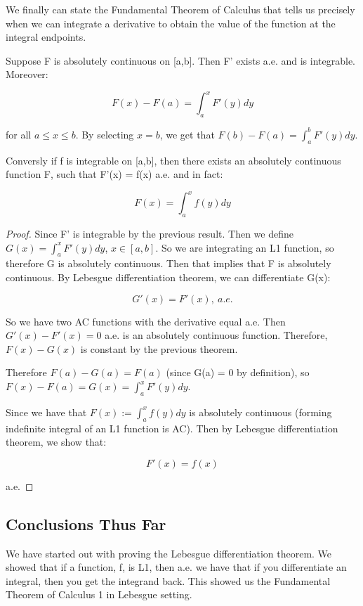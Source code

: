 \documentclass[class=article, crop=false]{standalone}
\begin{document}
			We finally can state the Fundamental Theorem of Calculus that tells us precisely when we can integrate a derivative to obtain the value of the function at the integral endpoints.

			\begin{theorem} 
				Suppose F is absolutely continuous on [a,b]. Then F' exists a.e. and is integrable. Moreover:

					$$F(x) - F(a) = \int_a^x F'(y) dy$$

				for all $a \le x \le b$. By selecting $x = b$, we get that $F(b) - F(a) = \int_a^b F'(y) dy$.

				Conversly if f is integrable on [a,b], then there exists an absolutely continuous function F, such that F'(x) = f(x) a.e. and in fact:

					$$F(x) = \int_a^x f(y) dy$$
			\end{theorem}
			\begin{proof}
				Since F' is integrable by the previous result. Then we define $G(x) = \int_a^x F'(y) dy$, $x \in [a,b]$. So we are integrating an L1 function, so therefore G is absolutely continuous. Then that implies that F is absolutely continuous. By Lebesgue differentiation theorem, we can differentiate G(x):

					$$G'(x) = F'(x),\ a.e.$$

				So we have two AC functions with the derivative equal a.e. Then $G'(x) - F'(x) = 0$ a.e. is an absolutely continuous function. Therefore, $F(x) - G(x)$ is constant by the previous theorem.

				Therefore $F(a) - G(a) = F(a)$ (since G(a) = 0 by definition), so $F(x) - F(a) = G(x) = \int_a^x F'(y) dy$.

				Since we have that $F(x) := \int_a^x f(y) dy$ is absolutely continuous (forming indefinite integral of an L1 function is AC). Then by Lebesgue differentiation theorem, we show that:

					$$F'(x) = f(x)$$

				a.e.
			\end{proof}

	\subsection{Conclusions Thus Far}
		We have started out with proving the Lebesgue differentiation theorem. We showed that if a function, f, is L1, then a.e. we have that if you differentiate an integral, then you get the integrand back. This showed us the Fundamental Theorem of Calculus 1 in Lebesgue setting.
\end{document}

